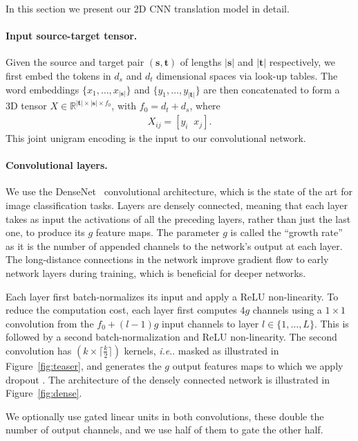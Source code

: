 \documentclass[11pt,a4paper]{article}
\makeatletter
\DeclareRobustCommand\onedot{\futurelet\@let@token\@onedot}
\def\@onedot{\ifx\@let@token.\else.\null\fi\xspace}
\def\ie{\emph{i.e}\onedot} \def\Ie{\emph{I.e}\onedot}
\def\fig#1{Figure~\ref{fig:#1}}
\newcommand{\src}{\boldsymbol s}
\newcommand{\trg}{\boldsymbol t}
\newcommand{\lsrc}{{|\boldsymbol s|}}
\newcommand{\ltrg}{{|\boldsymbol t|}}
\newcommand{\R}{\mathbb{R}}
\makeatother
\begin{document}
In this section we present our 2D CNN translation model in detail.

\paragraph{Input source-target tensor.}
Given the source and target pair $(\src,\trg)$ of lengths $\lsrc$ and $\ltrg$ respectively, we first embed the tokens in $d_s$ and $d_t$ dimensional spaces via look-up tables. 
The word embeddings $\{x_1,\ldots, x_\lsrc\}$ and $\{y_1,\ldots,y_\ltrg\}$ are then concatenated to form a 3D tensor $X\in\R^{\ltrg\times\lsrc\times f_0}$, with $f_0=d_t+d_s$, where
\begin{align}
    X_{ij} = [y_i \;\; x_j].
\end{align}
This joint unigram encoding is the input to our convolutional network. 


\paragraph{Convolutional layers.}



We use the DenseNet~\cite{huang17cvpr} convolutional architecture, which is the state of the art for image classification tasks.
Layers are densely connected, meaning that each layer takes as input the  activations of all the preceding layers, rather than just the last one, to produce its $g$ feature maps. The parameter $g$ is called the ``growth rate'' as it is the number of appended channels to the network's output at each layer.
The long-distance connections in the network improve gradient flow to early network layers during training, which is beneficial for deeper networks.

Each layer first batch-normalizes \cite{ioffe15icml} its input and apply a ReLU \cite{nair10icml} non-linearity. 
To reduce the computation cost, each layer first computes $4g$ channels using a $1\!\times\!1$ convolution from the $f_0 + (l-1)g$ input channels to layer $l\in\{1,\dots,L\}$. This is followed by a second batch-normalization and ReLU non-linearity. 
The second convolution has $(k\times \lceil \frac{k}{2}\rceil)$ kernels, \ie masked as illustrated in \fig{teaser}, and generates the $g$ output features maps to which we apply dropout \cite{srivastava14jmlr}.
The architecture of the densely connected network is illustrated in \fig{dense}.

We optionally use gated linear units \citep{dauphin17icml} in both convolutions, these double the number of output channels, and we use half of them to gate the other half.
\end{document}
